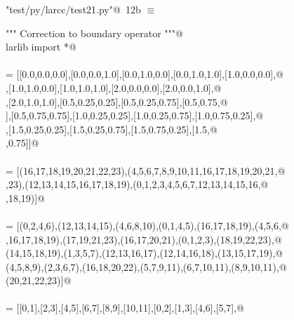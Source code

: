 \documentclass[11pt,oneside]{article}	%
\begin{document}
\begin{flushleft} \small \label{scrap21}
\protect{}\verb@"test/py/larcc/test21.py"@\nobreak\ {\footnotesize 12b }$\equiv$
\vspace{-1ex}
\begin{list}{}{} \item
\mbox{}\verb@""" Correction to boundary operator """@\\
\mbox{}\verb@from larlib import *@\\
\mbox{}\verb@@\\
\mbox{}\verb@V = [[0.0,0.0,0.0],[0.0,0.0,1.0],[0.0,1.0,0.0],[0.0,1.0,1.0],[1.0,0.0,0.0],@\\
\mbox{}\verb@[1.0,0.0,1.0],[1.0,1.0,0.0],[1.0,1.0,1.0],[2.0,0.0,0.0],[2.0,0.0,1.0],@\\
\mbox{}\verb@[2.0,1.0,0.0],[2.0,1.0,1.0],[0.5,0.25,0.25],[0.5,0.25,0.75],[0.5,0.75,@\\
\mbox{}],[0.5,0.75,0.75],[1.0,0.25,0.25],[1.0,0.25,0.75],[1.0,0.75,0.25],@\\
\mbox{}\verb@[1.0,0.75,0.75],[1.5,0.25,0.25],[1.5,0.25,0.75],[1.5,0.75,0.25],[1.5,@\\
\mbox{},0.75]]@\\
\mbox{}\verb@@\\
\mbox{}\verb@CV = [(16,17,18,19,20,21,22,23),(4,5,6,7,8,9,10,11,16,17,18,19,20,21,@\\
\mbox{},23),(12,13,14,15,16,17,18,19),(0,1,2,3,4,5,6,7,12,13,14,15,16,@\\
\mbox{},18,19)]@\\
\mbox{}\verb@@\\
\mbox{}\verb@FV = [(0,2,4,6),(12,13,14,15),(4,6,8,10),(0,1,4,5),(16,17,18,19),(4,5,6,@\\
\mbox{},16,17,18,19),(17,19,21,23),(16,17,20,21),(0,1,2,3),(18,19,22,23),@\\
\mbox{}\verb@(14,15,18,19),(1,3,5,7),(12,13,16,17),(12,14,16,18),(13,15,17,19),@\\
\mbox{}\verb@(4,5,8,9),(2,3,6,7),(16,18,20,22),(5,7,9,11),(6,7,10,11),(8,9,10,11),@\\
\mbox{}\verb@(20,21,22,23)]@\\
\mbox{}\verb@@\\
\mbox{}\verb@EV = [[0,1],[2,3],[4,5],[6,7],[8,9],[10,11],[0,2],[1,3],[4,6],[5,7],@\\

\end{list}
\end{flushleft}
\end{document}
